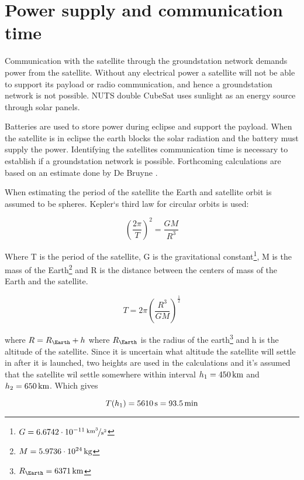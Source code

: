 \section{Power supply and communication time}

Communication with the satellite through the groundstation network demands power from the satellite. Without any electrical power a satellite will not be able to support its payload or radio communication, and hence a groundstation network is not possible. NUTS double CubeSat uses sunlight as an energy source through solar panels. 

Batteries are used to store power during eclipse and support the payload. When the satellite is in eclipse the earth blocks the solar radiation and the battery must supply the power. Identifying the satellites communication time is necessary to establish if a groundstation network is possible. Forthcoming calculations are based on an estimate done by De Bruyne \cite{Satellite Power Systems}.

When estimating the period of the satellite the Earth and satellite orbit is assumed to be spheres. Kepler`s third law for circular orbits is used:

\begin{equation}
\left(\frac{2\pi}{T}\right)^2 = \frac{GM}{R^3}
\label{eq:Keplers_3}
\end{equation}

Where T is the period of the satellite, G is the gravitational constant\footnote{$G=\unitfrac[6.6742\cdot 10^{-11}]{km^3}{s^2}$}, M is the mass of the Earth\footnote{$M=\unit[5.9736\cdot 10^{24}]{kg}$} and R is the distance between the centers of mass of the Earth and the satellite.

\begin{equation}
T = 2\pi \left(\frac{R^3}{GM}\right)^{\frac{1}{2}}
\label{eq:satellite_period}
\end{equation}

where $R = R_\Earth + h$ where $R_\Earth$ is the radius of the earth\footnote{$R_\Earth = \unit[6371]{km}$} and h is the altitude of the satellite. 
Since it is uncertain what altitude the satellite will settle in after it is launched, two heights are used in the calculations and it's assumed that the satellite wil settle somewhere within interval $h_1=\unit[450]{km}$ and $h_2=\unit[650]{km}$. 
Which gives

\begin{equation}
T(h_1) = \unit[5610]{s} = \unit[93.5]{min}
\end{equation}

